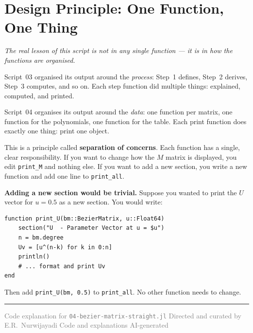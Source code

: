 \documentclass[12pt, a4paper]{article}
\newcommand{\cd}[1]{\texttt{#1}}
\begin{document}
\section{Design Principle: One Function, One Thing}

\textit{The real lesson of this script is not in any single
function --- it is in how the functions are organised.}

Script~03 organised its output around the \emph{process}:
Step~1 defines, Step~2 derives, Step~3 computes, and so on.
Each step function did multiple things: explained, computed,
and printed.

Script~04 organises its output around the \emph{data}:
one function per matrix, one function for the polynomials,
one function for the table.
Each print function does exactly one thing: print one object.

This is a principle called \textbf{separation of concerns}.
Each function has a single, clear responsibility.
If you want to change how the $M$ matrix is displayed,
you edit \cd{print\_M} and nothing else.
If you want to add a new section, you write a new function
and add one line to \cd{print\_all}.

\begin{examplebox}
\textbf{Adding a new section would be trivial.}
Suppose you wanted to print the $U$ vector for $u = 0.5$
as a new section. You would write:

\begin{verbatim}
function print_U(bm::BezierMatrix, u::Float64)
    section("U  - Parameter Vector at u = $u")
    n = bm.degree
    Uv = [u^(n-k) for k in 0:n]
    println()
    # ... format and print Uv
end
\end{verbatim}

Then add \cd{print\_U(bm, 0.5)} to \cd{print\_all}.
No other function needs to change.
\end{examplebox}

\vspace{2em}\hrule\vspace{0.5em}
{\small\textcolor{gray}{%
Code explanation for \texttt{04-bezier-matrix-straight.jl}
\textbar{} Directed and curated by E.R.\ Nurwijayadi
\textbar{} Code and explanations AI-generated}}
\end{document}
